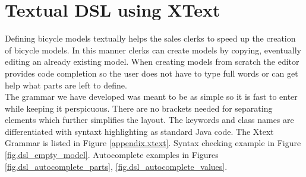 \section{Textual DSL using XText}
\label{sec.xtext}

\noindent
Defining bicycle models textually helps the sales clerks to 
speed up the creation of bicycle models. In this manner clerks 
can create models by copying, eventually editing 
an already existing model. When creating models from scratch 
the editor provides code completion so the user does not have to 
type full words or can get help what parts are left to define.\\
The grammar we have developed was meant to be as simple
so it is fast to enter while keeping it perspicuous. There are no
brackets needed for separating elements which further simplifies 
the layout. The keywords and class names are differentiated with 
syntaxt highlighting as standard Java code. 
The Xtext Grammar is listed in Figure \ref{appendix.xtext}.
Syntax checking example in Figure \ref{fig.dsl_empty_model}.
Autocomplete examples in Figures \ref{fig.dsl_autocomplete_parts},
\ref{fig.dsl_autocomplete_values}.

